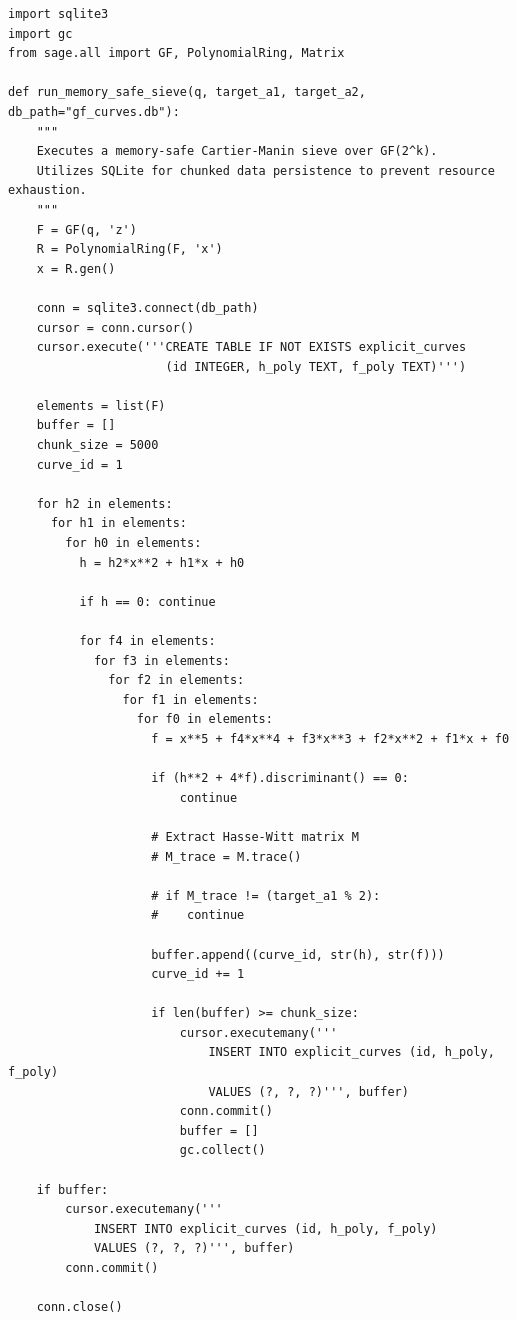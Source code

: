 \documentclass[12pt, letterpaper]{article}
\begin{document}
\begin{verbatim}
import sqlite3
import gc
from sage.all import GF, PolynomialRing, Matrix

def run_memory_safe_sieve(q, target_a1, target_a2, db_path="gf_curves.db"):
    """
    Executes a memory-safe Cartier-Manin sieve over GF(2^k).
    Utilizes SQLite for chunked data persistence to prevent resource exhaustion.
    """
    F = GF(q, 'z')
    R = PolynomialRing(F, 'x')
    x = R.gen()
    
    conn = sqlite3.connect(db_path)
    cursor = conn.cursor()
    cursor.execute('''CREATE TABLE IF NOT EXISTS explicit_curves
                      (id INTEGER, h_poly TEXT, f_poly TEXT)''')
    
    elements = list(F)
    buffer = []
    chunk_size = 5000
    curve_id = 1
    
    for h2 in elements:
      for h1 in elements:
        for h0 in elements:
          h = h2*x**2 + h1*x + h0
          
          if h == 0: continue
          
          for f4 in elements:
            for f3 in elements:
              for f2 in elements:
                for f1 in elements:
                  for f0 in elements:
                    f = x**5 + f4*x**4 + f3*x**3 + f2*x**2 + f1*x + f0
                    
                    if (h**2 + 4*f).discriminant() == 0:
                        continue
                        
                    # Extract Hasse-Witt matrix M
                    # M_trace = M.trace()
                    
                    # if M_trace != (target_a1 % 2):
                    #    continue
                        
                    buffer.append((curve_id, str(h), str(f)))
                    curve_id += 1
                    
                    if len(buffer) >= chunk_size:
                        cursor.executemany('''
                            INSERT INTO explicit_curves (id, h_poly, f_poly)
                            VALUES (?, ?, ?)''', buffer)
                        conn.commit()
                        buffer = []
                        gc.collect() 
                        
    if buffer:
        cursor.executemany('''
            INSERT INTO explicit_curves (id, h_poly, f_poly)
            VALUES (?, ?, ?)''', buffer)
        conn.commit()
        
    conn.close()
\end{verbatim}
\end{document}
